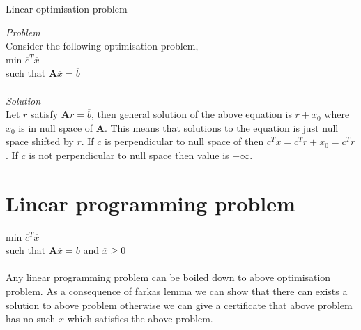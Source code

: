 \documentclass{tufte-handout}
\theoremstyle{remark}
\begin{document}
\begin{marginfigure}
\caption{Linear optimisation problem}
\end{marginfigure}
\textit{Problem}\\
Consider the following optimisation problem,\\
min $\overline{c}^T\overline{x}$ \\
such that $\mathbf{A}\overline{x} = \overline{b}$\\ \ \\
\textit{Solution}\\
Let $\overline{r}$ satisfy $\mathbf{A}\overline{r} = \overline{b}$, then general solution of the above equation is $\overline{r} + \overline{x_0}$ where $\overline{x_0}$ is in null space of $\mathbf{A}$. This means that solutions to the equation is just null space shifted by $\overline{r}$. If $\overline{c}$ is perpendicular to null space of then $\overline{c}^T\overline{x} = \overline{c}^T\overline{r} + \overline{x_0} = \overline{c}^T\overline{r}$. If $\overline{c}$ is not perpendicular to null space then value is $-\infty$.

\section{Linear programming problem}
min $\overline{c}^T\overline{x}$\\
such that $\mathbf{A}\overline{x} = \overline{b}$ and $\overline{x} \ge 0$\\ \ \\
Any linear programming problem can be boiled down to above optimisation problem. As a consequence of farkas lemma we can show that there can exists a solution to above problem otherwise we can give a certificate that above problem has no such $\overline{x}$ which satisfies the above problem.
\end{document}
